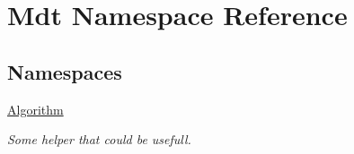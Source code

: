 \hypertarget{namespace_mdt}{}\section{Mdt Namespace Reference}
\label{namespace_mdt}
\subsection*{Namespaces}
\begin{DoxyCompactItemize}
\item 
 \hyperlink{namespace_mdt_1_1_algorithm}{Algorithm}
\begin{DoxyCompactList}\small\item\em Some helper that could be usefull. \end{DoxyCompactList}\end{DoxyCompactItemize}
